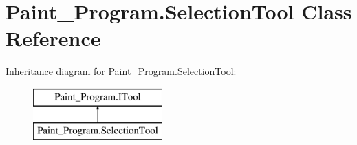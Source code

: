 \hypertarget{class_paint___program_1_1_selection_tool}{}\section{Paint\+\_\+\+Program.\+Selection\+Tool Class Reference}
\label{class_paint___program_1_1_selection_tool}
Inheritance diagram for Paint\+\_\+\+Program.\+Selection\+Tool\+:\begin{figure}[H]
\begin{center}
\leavevmode
\includegraphics[height=2.000000cm]{class_paint___program_1_1_selection_tool}
\end{center}
\end{figure}
